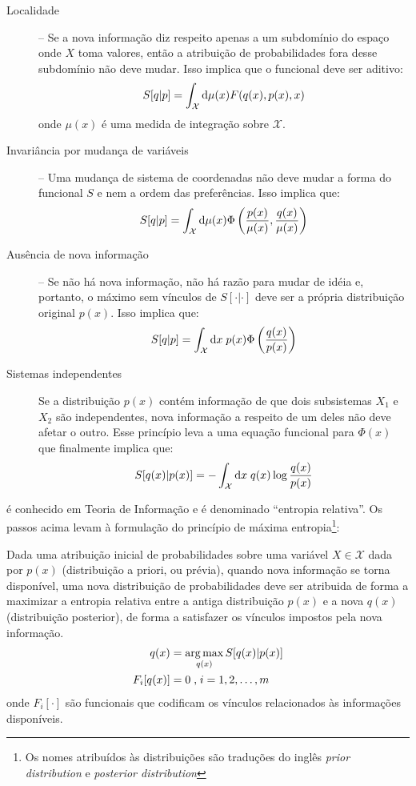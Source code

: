 \begin{description}
\item[Localidade] -- Se a nova informação diz respeito apenas a um subdomínio do espaço onde $X$ toma valores, então a atribuição de probabilidades fora desse subdomínio não deve mudar. Isso implica que o funcional deve ser aditivo:
    \[
     S[q | p] = \int_{\mathcal{X}} \mathrm{d}\mu(x) F(q(x), p(x), x)
    \]
    onde $\mu(x)$ é uma medida de integração sobre $\mathcal{X}$. 
\item[Invariância por mudança de variáveis] -- Uma mudança de sistema de coordenadas não deve mudar a forma do funcional $S$ e nem a ordem das preferências. Isso implica que:
    \[
     S[q | p] = \int_{\mathcal{X}} \mathrm{d}\mu(x) \Phi\left(\frac{p(x)}{\mu(x)},\frac{q(x)}{\mu(x)}\right)
    \]
\item[Ausência de nova informação] -- Se não há nova informação, não há razão para mudar de idéia e, portanto, o máximo sem vínculos de $S[\cdot|\cdot]$ deve ser a própria distribuição original $p(x)$. Isso implica que:
    \[
     S[q | p] = \int_{\mathcal{X}} \mathrm{d} x\; p(x) \Phi\left(\frac{q(x)}{p(x)}\right) 
    \]
\item[Sistemas independentes] 
    Se a distribuição $p(x)$ contém informação de que dois subsistemas $X_1$ e $X_2$ são independentes, nova informação a respeito de um deles não deve afetar o outro. Esse princípio leva a uma equação funcional para $\Phi(x)$ que finalmente implica que:
    \begin{equation}
      \label{eq:relel}
      S[q(x) | p(x)] =  - \int_{\mathcal{X}} \ud x\; q(x) \log\frac{q(x)}{p(x)}
    \end{equation}
\end{description}

 é conhecido em Teoria de Informação\cite{Cover2006} e é denominado ``entropia relativa''. Os passos acima levam à formulação do princípio de máxima entropia\footnote{Os nomes atribuídos às distribuições são traduções do inglês \textit{prior distribution} e {\it posterior distribution}}:

\begin{Principio}
  Dada uma atribuição inicial de probabilidades sobre uma variável $X \in \mathcal{X}$ dada por $p(x)$ (distribuição a priori, ou prévia), quando nova informação se torna disponível, uma nova distribuição de probabilidades deve ser atribuida de forma a maximizar a entropia relativa entre a antiga distribuição $p(x)$  e a nova $q(x)$ (distribuição  posterior), de forma a satisfazer os vínculos impostos pela nova informação.
  \begin{align}
    q(x) &= \operatorname*{arg\,max}_{q(x)} S[q(x)|p(x)] \\
    F_i[q(x)] &= 0 \;\text{,}\;i = 1,2,\ldots,m
  \end{align}
  onde $F_i[\cdot]$ são funcionais que codificam os vínculos relacionados às informações disponíveis.
\end{Principio}

